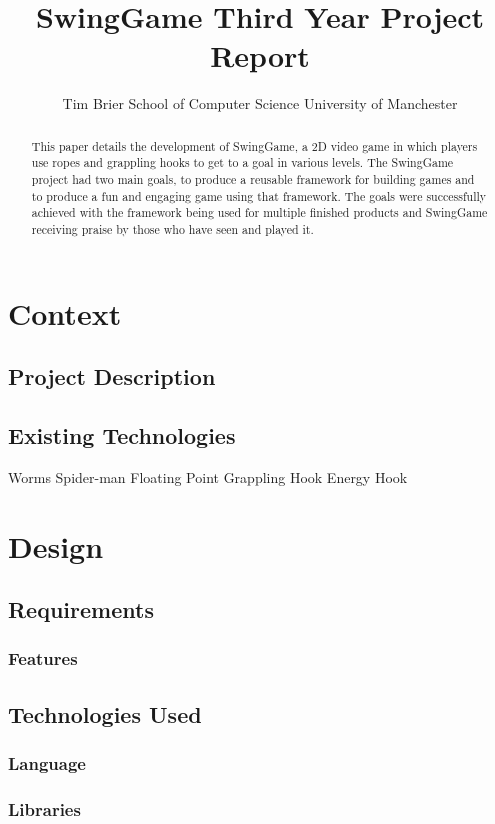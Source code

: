 \documentclass[]{report}
\title{
	SwingGame\endgraf
	Third Year Project Report}
\author{
	\parbox{\linewidth}{
		\centering%
		Tim Brier\endgraf
		School of Computer Science\endgraf
		University of Manchester
	}
}
\date{
	\parbox{\linewidth}{
		\centering%
		April 2015\endgraf\bigskip
		Supervised by Dr Steve Pettifer
	}
}
\begin{document}
\maketitle

\begin{abstract}
	This paper details the development of SwingGame, a 2D video game in which players use ropes and grappling hooks to get to a goal in various levels.  The SwingGame project had two main goals, to produce a reusable framework for building games and to produce a fun and engaging game using that framework. The goals were successfully achieved with the framework being used for multiple finished products and SwingGame receiving praise by those who have seen and played it.
\end{abstract}

\tableofcontents{}


\chapter{Context}
	\section{Project Description}
	\section{Existing Technologies}
	Worms
	Spider-man
	Floating Point
	Grappling Hook
	Energy Hook

\chapter{Design}
	\section{Requirements}
		\subsection{Features}
	\section{Technologies Used}
		\subsection{Language}
		\subsection{Libraries}
\end{document}
